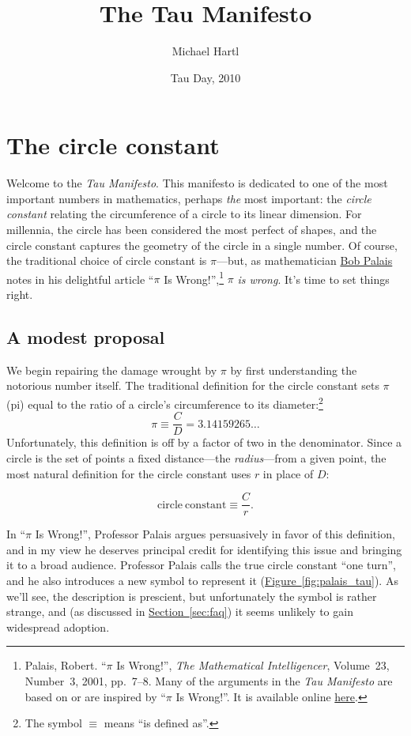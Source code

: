 \documentclass{article}
\begin{document}
\title{The Tau Manifesto}
\author{Michael Hartl}
\date{Tau Day, 2010}
\maketitle

\section{The circle constant} %
\label{sec:the_circle_constant}

Welcome to the \emph{Tau Manifesto}. This manifesto is dedicated to one of the most important numbers in mathematics, perhaps \emph{the} most important: the \emph{circle constant} relating the circumference of a circle to its linear dimension. For millennia, the circle has been considered the most perfect of shapes, and the circle constant captures the geometry of the circle in a single number. Of course, the traditional choice of circle constant is $\pi$---but, as mathematician \href{http://www.math.utah.edu/~palais/}{Bob Palais} notes in his delightful article ``$\pi$ Is Wrong!'',\footnote{Palais, Robert. ``$\pi$ Is Wrong!'', \emph{The Mathematical Intelligencer}, Volume~23, Number~3, 2001, pp.~7--8. Many of the arguments in the \emph{Tau Manifesto} are based on or are inspired by ``$\pi$ Is Wrong!''. It is available online \href{http://www.math.utah.edu/~palais/pi.html}{here}.} $\pi$ \emph{is wrong}. It's time to set things right.

  \subsection{A modest proposal} %
  \label{sec:a_modest_proposal}

We begin repairing the damage wrought by $\pi$ by first understanding the notorious number itself. The traditional definition for the circle constant sets $\pi$ (pi) equal to the ratio of a circle's circumference to its diameter:\footnote{The symbol $\equiv$ means ``is defined as''.}
\[
  \pi \equiv \frac{C}{D} = 3.14159265\ldots
\]
Unfortunately, this definition is off by a factor of two in the denominator. Since a circle is the set of points a fixed distance---the \emph{radius}---from a given point, the most natural definition for the circle constant uses $r$ in place of $D$:

\[
  \mathrm{circle\ constant} \equiv \frac{C}{r}.
\]

In ``$\pi$ Is Wrong!'', Professor Palais argues persuasively in favor of this definition, and in my view he deserves principal credit for identifying this issue and bringing it to a broad audience. Professor Palais calls the true circle constant ``one turn'', and he also introduces a new symbol to represent it (\hyperref[fig:palais_tau]{Figure~}\ref{fig:palais_tau}). As we'll see, the description is prescient, but unfortunately the symbol is rather strange, and (as discussed in \hyperref[sec:faq]{Section~}\ref{sec:faq}) it seems unlikely to gain widespread adoption.
\end{document}

